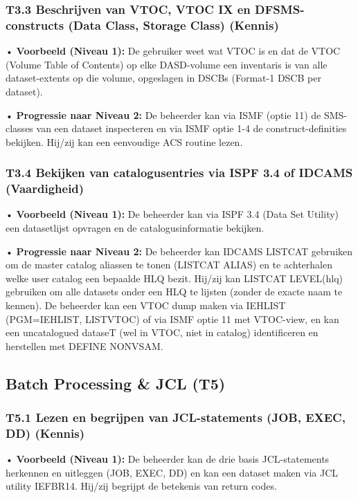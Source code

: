 \subsubsection{T3.3 Beschrijven van VTOC, VTOC IX en DFSMS-constructs (Data Class, Storage Class) (Kennis)}

• \textbf{Voorbeeld (Niveau 1):} De gebruiker weet wat VTOC is en dat de {VTOC} (Volume Table of Contents) op elke DASD-volume een inventaris is van alle dataset-extents op die volume, opgeslagen in DSCBs (Format-1 DSCB per dataset). 

• \textbf{Progressie naar Niveau 2:} De beheerder kan via ISMF (optie 11) de SMS-classes van een dataset inspecteren en via ISMF optie 1-4 de construct-definities bekijken. Hij/zij kan een eenvoudige ACS routine lezen.
\subsubsection{T3.4 Bekijken van catalogusentries via ISPF 3.4 of IDCAMS (Vaardigheid)}

• \textbf{Voorbeeld (Niveau 1):} De beheerder kan via {ISPF 3.4} (Data Set Utility) een datasetlijst opvragen en de catalogusinformatie bekijken.

• \textbf{Progressie naar Niveau 2:} De beheerder kan IDCAMS LISTCAT gebruiken om de master catalog aliassen te tonen ({LISTCAT ALIAS}) en te achterhalen welke user catalog een bepaalde HLQ bezit. Hij/zij kan {LISTCAT LEVEL(hlq)} gebruiken om alle datasets onder een HLQ te lijsten (zonder de exacte naam te kennen). De beheerder kan een {VTOC dump} maken via IEHLIST ({PGM=IEHLIST, LISTVTOC}) of via ISMF optie 11 met VTOC-view, en kan een uncatalogued dataseT (wel in VTOC, niet in catalog) identificeren en herstellen met {DEFINE NONVSAM}.

\subsection{Batch Processing \& JCL (T5)}

\subsubsection{T5.1 Lezen en begrijpen van JCL-statements (JOB, EXEC, DD) (Kennis)}

• \textbf{Voorbeeld (Niveau 1):} De beheerder kan de drie basis JCL-statements herkennen en uitleggen (JOB, EXEC, DD) en kan een dataset maken via JCL utility IEFBR14. Hij/zij begrijpt de betekenis van return codes.

